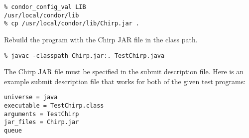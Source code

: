 \begin{verbatim}
% condor_config_val LIB
/usr/local/condor/lib
% cp /usr/local/condor/lib/Chirp.jar .
\end{verbatim}

Rebuild the program with the Chirp JAR file in the class path.

\begin{verbatim}
% javac -classpath Chirp.jar:. TestChirp.java
\end{verbatim}

The Chirp JAR file must be specified in the submit description file.
Here is an example submit description file that works for both
of the given test programs:

\begin{verbatim}
universe = java
executable = TestChirp.class
arguments = TestChirp
jar_files = Chirp.jar
queue
\end{verbatim}
